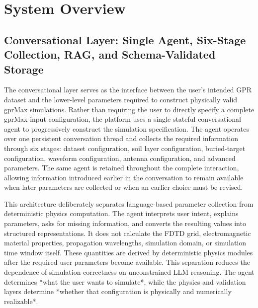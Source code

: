 \documentclass[journal]{IEEEtran}
\begin{document}
\section{System Overview}




\subsection{ Conversational Layer: Single Agent, Six-Stage Collection, RAG, and Schema-Validated Storage}

The conversational layer serves as the interface between the user's intended GPR dataset and the lower-level parameters required to construct physically valid gprMax simulations. Rather than requiring the user to directly specify a complete gprMax input configuration, the platform uses a single stateful conversational agent to progressively construct the simulation specification. The agent operates over one persistent conversation thread and collects the required information through six stages: dataset configuration, soil layer configuration, buried-target configuration, waveform configuration, antenna configuration, and advanced parameters. The same agent is retained throughout the complete interaction, allowing information introduced earlier in the conversation to remain available when later parameters are collected or when an earlier choice must be revised.

This architecture deliberately separates language-based parameter collection from deterministic physics computation. The agent interprets user intent, explains parameters, asks for missing information, and converts the resulting values into structured representations. It does not calculate the FDTD grid, electromagnetic material properties, propagation wavelengths, simulation domain, or simulation time window itself. These quantities are derived by deterministic physics modules after the required user parameters become available. This separation reduces the dependence of simulation correctness on unconstrained LLM reasoning. The agent determines *what the user wants to simulate*, while the physics and validation layers determine *whether that configuration is physically and numerically realizable*.
\end{document}
